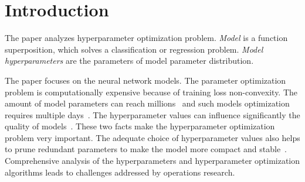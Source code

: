 \documentclass[smallcondensed]{svjour3}
\begin{document}
\begin{abstract}
\end{abstract}
\section{Introduction}
\label{intro}
The paper analyzes hyperparameter optimization problem. \textit{Model} is a function superposition, which solves a classification or regression problem. \textit{Model hyperparameters} are the parameters of model parameter distribution.

The paper focuses on the neural network models. The parameter optimization problem is computationally expensive because of training loss non-convexity. The amount of model parameters can reach millions~\cite{hinton_rbm}  and such models optimization requires multiple days~\cite{suts}.   The hyperparameter values can influence significantly the quality of models~\cite{journal1,journal2}. These two facts make the hyperparameter optimization problem very important. The adequate choice of hyperparameter values also helps to prune redundant parameters to make the model more compact and stable~\cite{nips,ard}. Comprehensive analysis of the hyperparameters and hyperparameter optimization algorithms leads to challenges addressed by operations research.
\end{document}
